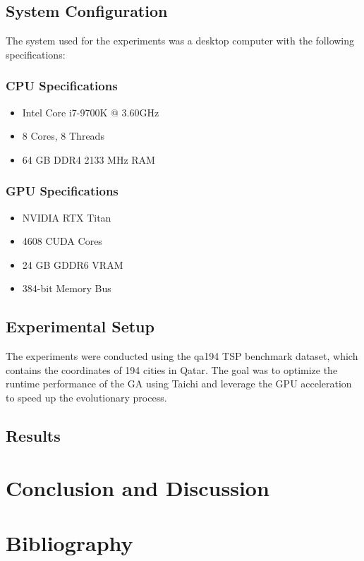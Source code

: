 \documentclass[conference]{IEEEtran}
\begin{document}
\subsection{System Configuration}
The system used for the experiments was a desktop computer with the following
specifications:

\subsubsection{CPU Specifications}
\begin{itemize}
    \item Intel Core i7-9700K @ 3.60GHz
    \item 8 Cores, 8 Threads
    \item 64 GB DDR4 2133 MHz RAM
\end{itemize}

\subsubsection{GPU Specifications}
\begin{itemize}
    \item NVIDIA RTX Titan
    \item 4608 CUDA Cores
    \item 24 GB GDDR6 VRAM
    \item 384-bit Memory Bus
\end{itemize}

\subsection{Experimental Setup}
The experiments were conducted using the qa194 TSP benchmark dataset, which
contains the coordinates of 194 cities in Qatar. The goal was to optimize the
runtime performance of the GA using Taichi and leverage the GPU acceleration to
speed up the evolutionary process.

\subsection{Results}


\section{Conclusion and Discussion}

\section{Bibliography}
\end{document}
